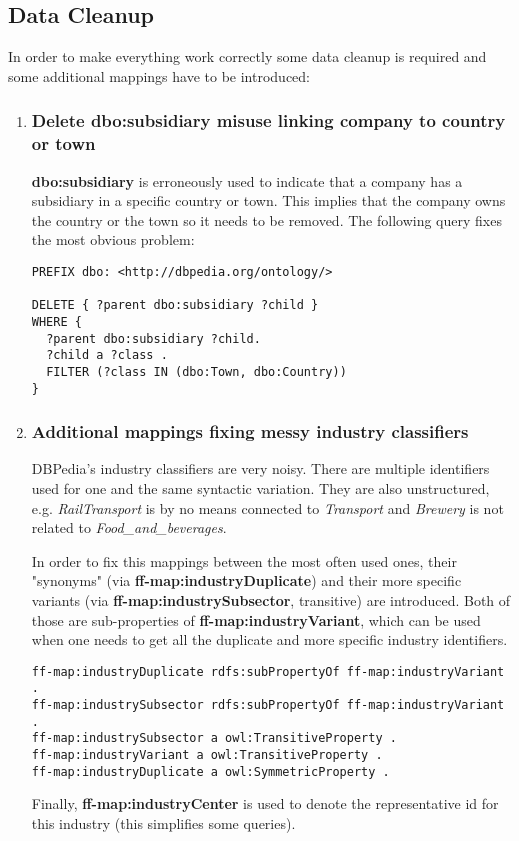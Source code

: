 \subsection{Data Cleanup}
In order to make everything work correctly some data cleanup is required and some additional mappings have to be introduced:
\begin{enumerate}
    \item \subsubsection {Delete dbo:subsidiary misuse linking company to country or town}
    
    \textbf{dbo:subsidiary} is erroneously used to indicate that a company has a subsidiary in a specific country or town. This implies that the company owns the country or the town so it needs to be removed. The following query fixes the most obvious problem:
    
\begin{verbatim}
PREFIX dbo: <http://dbpedia.org/ontology/>

DELETE { ?parent dbo:subsidiary ?child }
WHERE {
  ?parent dbo:subsidiary ?child.
  ?child a ?class .
  FILTER (?class IN (dbo:Town, dbo:Country))
}
\end{verbatim}

    \item \subsubsection{Additional mappings fixing messy industry classifiers}
    DBPedia's industry classifiers are very noisy. There are multiple identifiers used for one and the same syntactic variation. They are also unstructured, e.g. \textit{RailTransport} is by no means connected to \textit{Transport} and \textit{Brewery} is not related to \textit{Food\_and\_beverages}.
    
    In order to fix this mappings between the most often used ones, their "synonyms" (via \textbf{ff-map:industryDuplicate}) and their more specific variants (via \textbf{ff-map:industrySubsector}, transitive) are introduced. Both of those are sub-properties of \textbf{ff-map:industryVariant}, which can be used when one needs to get all the duplicate and more specific industry identifiers.
\begin{verbatim}
ff-map:industryDuplicate rdfs:subPropertyOf ff-map:industryVariant .
ff-map:industrySubsector rdfs:subPropertyOf ff-map:industryVariant .
ff-map:industrySubsector a owl:TransitiveProperty .
ff-map:industryVariant a owl:TransitiveProperty .
ff-map:industryDuplicate a owl:SymmetricProperty .
\end{verbatim}
    Finally, \textbf{ff-map:industryCenter} is used to denote the representative id for this industry (this simplifies some queries).
    

\end{enumerate}
